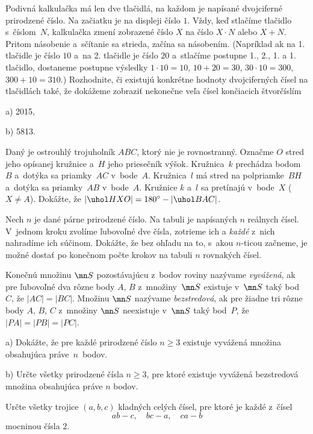 {%
Podivná kalkulačka má len dve tlačidlá, na každom je napísané dvojciferné pri\-ro\-dze\-né číslo. Na začiatku je na displeji číslo $1$. Vždy, keď stlačíme tlačidlo s~číslom~$N$, kalkulačka zmení zobrazené číslo $X$ na číslo $X\cdot N$ alebo $X+N$. Pritom násobenie a~sčítanie sa strieda, začína sa násobením. (Napríklad ak na 1. tlačidle je číslo $10$ a~na 2. tlačidle je číslo $20$ a~stlačíme postupne 1., 2., 1. a 1. tlačidlo, dostaneme postupne výsledky $1\cdot10=10$, $10+20=30$, $30\cdot10=300$, $300+10=310$.) Rozhodnite, či existujú konkrétne hodnoty dvojciferných čísel na tlačidlách také, že dokážeme zobraziť nekonečne veľa čísel končiacich štvorčíslím
\item{a)} 2015,
\item{b)} 5813.}

{%
Daný je ostrouhlý trojuholník $ABC$, ktorý nie je rovnostranný. Označme $O$ stred jeho opísanej kružnice a~$H$ jeho priesečník výšok. Kružnica~$k$ prechádza bodom~$B$ a~dotýka sa priamky~$AC$ v~bode~$A$. Kružnica~$l$ má stred na polpriamke~$BH$ a~dotýka sa priamky~$AB$ v~bode~$A$. Kružnice $k$ a~$l$ sa pretínajú v~bode~$X$ ($X\ne A$). Dokážte, že $|\uhol HXO|=180{^\circ}-|\uhol BAC|$.}

{%
Nech $n$ je dané párne prirodzené číslo. Na tabuli je napísaných $n$ reálnych čísel. V~jednom kroku zvolíme ľubovoľné dve čísla, zotrieme ich a {\it každé\/} z~nich nahradíme ich súčinom. Dokážte, že bez ohľadu na to, s~akou $n$-ticou začneme, je možné dostať po konečnom počte krokov na tabuli $n$ rovnakých čísel.}

{%
Konečnú množinu $\mn S$ pozostávajúcu z~bodov roviny nazývame {\it vyvážená}, ak pre ľubovoľné dva rôzne body $A$, $B$ z~množiny~$\mn S$ existuje v~$\mn S$ taký bod~$C$, že $|AC|=|BC|$.
Množinu $\mn S$ nazývame {\it bezstredová}, ak pre žiadne tri rôzne body $A$, $B$, $C$ z~množiny $\mn S$ neexistuje v~$\mn S$ taký bod~$P$, že $|PA|=|PB|=|PC|$.
\item{a)} Dokážte, že pre každé prirodzené číslo $n\ge3$ existuje vyvážená množina obsahujúca práve~$n$~bodov.
\item{b)} Určte všetky prirodzené čísla $n\ge3$, pre ktoré existuje vyvážená bezstredová množina obsahujúca práve $n$ bodov.\endgraf
 }

{%
Určte všetky trojice $(a,b,c)$ kladných celých čísel, pre ktoré je každé z~čísel
$$
ab-c, \quad bc-a, \quad ca-b
$$
mocninou čísla $2$.}


